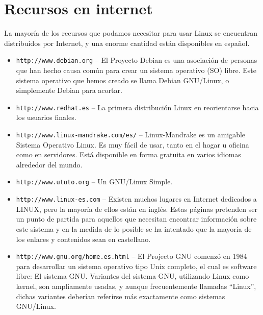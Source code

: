   
\chapter{Recursos en internet}
\label{recursos}  

La mayoría  de los recursos que  podamos necesitar para usar  Linux se
encuentran  distribuidos por  Internet,  y una  enorme cantidad  están
disponibles en español.

\begin{itemize}

\item {\tt http://www.debian.org} -- El Proyecto Debian es una asociación
  de  personas  que  han  hecho  causa común  para  crear  un  sistema
  operativo (SO)  libre. Este  sistema operativo  que hemos  creado se
  llama Debian GNU/Linux, o simplemente Debian para acortar.

\item {\tt http://www.redhat.es} --  La  primera  distribución Linux  en
  reorientarse hacia los usuarios finales.

\item {\tt http://www.linux-mandrake.com/es/} -- Linux-Mandrake es
  un amigable  Sistema Ope\-ra\-ti\-vo  Linux. Es  muy fácil  de usar,
  tanto en el  hogar u oficina como en servidores.  Está disponible en
  forma gratuita en varios idiomas alrededor del mundo.

\item {\tt http://www.ututo.org} -- Un GNU/Linux Simple.

\item {\tt http://www.linux-es.com} -- Existen muchos lugares en
  Internet  dedicados  a  LINUX,  pero  la mayoría de ellos están en
  inglés. Estas páginas  pretenden  ser un  punto  de  partida  para
  aquellos  que necesitan encontrar información sobre este sistema y
  en  la  medida de lo posible se ha intentado que la mayoría de los
  enlaces y contenidos sean en castellano.

\item {\tt http://www.gnu.org/home.es.html} -- El  Projecto  GNU
  comenzó en  1984 para  desarrollar un sistema  operativo tipo Unix
  completo, el cual  es  software libre:  El  sistema  GNU. Variantes
  del  sistema GNU, utilizando Linux  como  kernel,  son  ampliamente
  usadas, y aunque frecuentemente llamadas ``Linux'', dichas variantes
  deberían referirse más exactamente como sistemas GNU/Linux.


\end{itemize}
